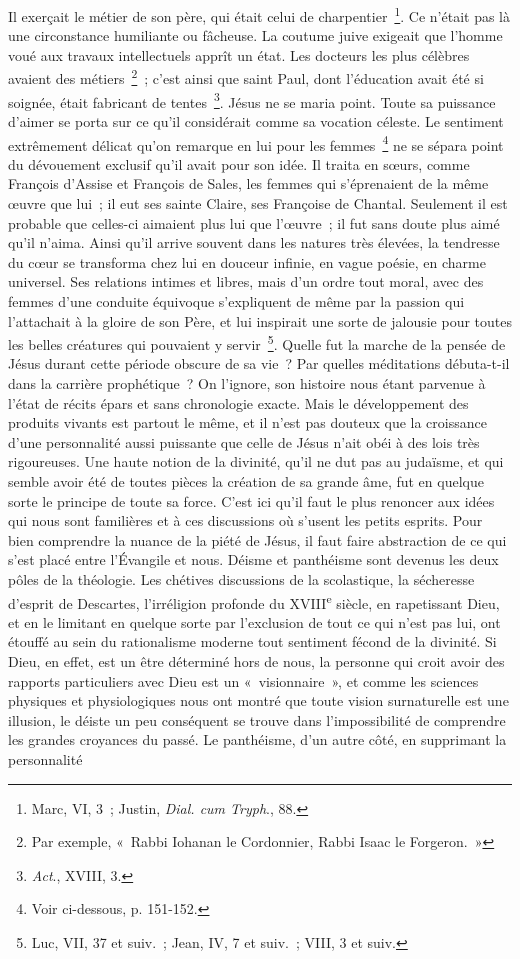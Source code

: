 \documentclass[french,twoside]{book} %
\begin{document}
Il exerçait le métier de son père, qui était celui de charpentier \footnote{ Marc, VI, 3 ; Justin, {\itshape Dial. cum Tryph}., 88.}. Ce n’était pas là une circonstance humiliante ou fâcheuse. La coutume juive exigeait que l’homme voué aux travaux intellectuels apprît un état. Les docteurs les plus célèbres avaient des métiers \footnote{Par exemple, « Rabbi Iohanan le Cordonnier, Rabbi Isaac le Forgeron. »} ; c’est ainsi que saint Paul, dont l’éducation avait été si soignée, était fabricant de tentes \footnote{{\itshape Act}., XVIII, 3.}. Jésus ne se maria point. Toute sa puissance d’aimer se porta sur ce qu’il considérait comme sa vocation céleste. Le sentiment extrêmement délicat qu’on remarque en lui pour les femmes \footnote{Voir ci-dessous, p. 151-152.} ne se sépara point du dévouement exclusif qu’il avait pour son idée. Il traita en sœurs, comme François d’Assise et François de Sales, les femmes qui s’éprenaient de la même œuvre que lui ; il eut ses sainte Claire, ses Françoise de Chantal. Seulement il est probable que celles-ci aimaient plus lui que l’œuvre ; il fut sans doute plus aimé qu’il n’aima. Ainsi qu’il arrive souvent dans les natures très élevées, la tendresse du cœur se transforma chez lui en douceur infinie, en vague poésie, en charme universel. Ses relations intimes et libres, mais d’un ordre tout moral, avec des femmes d’une conduite équivoque s’expliquent de même par la passion qui l’attachait à la gloire de son Père, et lui inspirait une sorte de jalousie pour toutes les belles créatures qui pouvaient y servir \footnote{Luc, VII, 37 et suiv. ; Jean, IV, 7 et suiv. ; VIII, 3 et suiv.}. Quelle fut la marche de la pensée de Jésus durant cette période obscure de sa vie ? Par quelles méditations débuta-t-il dans la carrière prophétique ? On l’ignore, son histoire nous étant parvenue à l’état de récits épars et sans chronologie exacte. Mais le développement des produits vivants est partout le même, et il n’est pas douteux que la croissance d’une personnalité aussi puissante que celle de Jésus n’ait obéi à des lois très rigoureuses. Une haute notion de la divinité, qu’il ne dut pas au judaïsme, et qui semble avoir été de toutes pièces la création de sa grande âme, fut en quelque sorte le principe de toute sa force. C’est ici qu’il faut le plus renoncer aux idées qui nous sont familières et à ces discussions où s’usent les petits esprits. Pour bien comprendre la nuance de la piété de Jésus, il faut faire abstraction de ce qui s’est placé entre l’Évangile et nous. Déisme et panthéisme sont devenus les deux pôles de la théologie. Les chétives discussions de la scolastique, la sécheresse d’esprit de Descartes, l’irréligion profonde du XVIII\textsuperscript{e} siècle, en rapetissant Dieu, et en le limitant en quelque sorte par l’exclusion de tout ce qui n’est pas lui, ont étouffé au sein du rationalisme moderne tout sentiment fécond de la divinité. Si Dieu, en effet, est un être déterminé hors de nous, la personne qui croit avoir des rapports particuliers avec Dieu est un « visionnaire », et comme les sciences physiques et physiologiques nous ont montré que toute vision surnaturelle est une illusion, le déiste un peu conséquent se trouve dans l’impossibilité de comprendre les grandes croyances du passé. Le panthéisme, d’un autre côté, en supprimant la personnalité 
\end{document}
